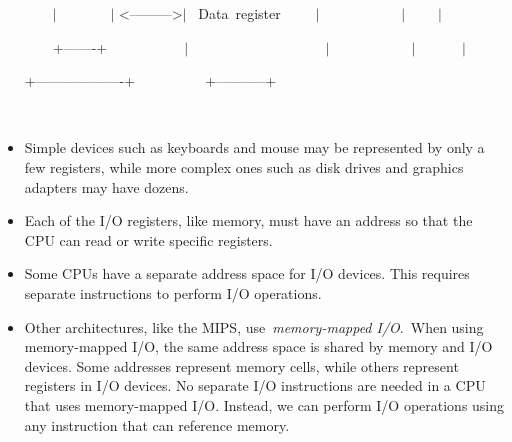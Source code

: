 \documentclass[12pt]{article}
\begin{document}
\begin{itemize}
{\fontsize{10pt}{12.0pt}\selectfont  \tabto{0.64in} \ \ \ \ $ \vert $ \ \ \ \ \ \ \ $ \vert $ <--------->$ \vert $ \ Data\ register\ \ \ \ \ $ \vert $ \ \ \ \ \ \ \ \ \ \ \ $ \vert $ \ \ \ \        $ \vert $ \par}\par

{\fontsize{10pt}{12.0pt}\selectfont  \tabto{0.64in} \ \ \ \ +-------+\ \ \ \ \ \ \ \ \ \ \ $ \vert $ \ \ \ \ \ \ \ \ \ \ \ \ \ \ \ \ \ \ \ $ \vert $ \ \ \ \ \ \ \ \ \ \ \ $ \vert $ \ \ \ \ \ \      $ \vert $ \par}\par

 \tabto{0.64in}  \tabto{1.27in}  \tabto{1.91in} {\fontsize{10pt}{12.0pt}\selectfont  \tabto{2.54in} +-------------------+\ \ \ \ \ \ \ \ \ \  +-----------+\par}\par

{\fontsize{10pt}{12.0pt}\selectfont  \tabto{0.64in} \ \ \  \par}\par

\setlength{\parskip}{5.04pt}
	\item {\fontsize{13pt}{15.6pt}\selectfont Simple devices such as keyboards and mouse may be represented by only a few registers, while more complex ones such as disk drives and graphics adapters may have dozens.\par}\par

	\item {\fontsize{13pt}{15.6pt}\selectfont Each of the I/O registers, like memory, must have an address so that the CPU can read or write specific registers.\par}\par

	\item {\fontsize{13pt}{15.6pt}\selectfont Some CPUs have a separate address space for I/O devices. This requires separate instructions to perform I/O operations.\par}\par

	\item {\fontsize{13pt}{15.6pt}\selectfont Other architectures, like the MIPS, use \textit{memory-mapped I/O}. When using memory-mapped I/O, the same address space is shared by memory and I/O devices. Some addresses represent memory cells, while others represent registers in I/O devices. No separate I/O instructions are needed in a CPU that uses memory-mapped I/O. Instead, we can perform I/O operations using any instruction that can reference memory.\par}\par


\end{itemize}
\end{document}
